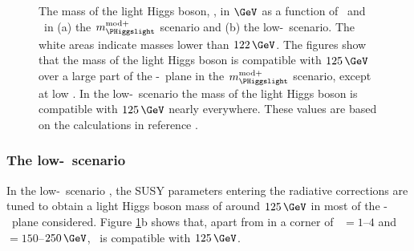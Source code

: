 \begin{figure}[h!]
\begin{center}
\end{center}
\caption[The mass of the light Higgs boson, \mh, as a function of \mA~and
\tanb~in the $m_{\PHiggslight}^{\text{mod+}}$ scenario and the low-\tanb~scenario.]{The mass of the light Higgs boson, \mh, in $\GeV$ as a function 
of \mA~and \tanb~in (a) the $m_{\PHiggslight}^{\text{mod+}}$ scenario and (b) the low-\tanb~scenario. The white areas
indicate masses lower than $122\,\GeV$. The figures show that
the mass of the light Higgs boson is compatible with $125\,\GeV$ over a large
part of the \mA-\tanb~plane in the $m_{\PHiggslight}^{\text{mod+}}$ scenario, except at low \tanb. In the low-\tanb~scenario
the mass of the light Higgs boson is compatible with $125\,\GeV$ nearly everywhere. These values are based on the calculations in reference \cite{YR3}.}
\label{fig:mhmodp_mh}
\end{figure}

\subsubsection{The low-\tanb~scenario}
\label{sec:theory_BSM_model_lowtb}
In the low-\tanb~scenario \cite{Hein-low-tb-high,MSSM-lowtanb}, the SUSY parameters entering
the radiative corrections are tuned to obtain a light 
Higgs boson mass of around $125\,\GeV$ in most of the \mbox{\mA-\tanb}~plane considered.
Figure \ref{fig:mhmodp_mh}b shows that, apart from in a corner of \tanb~$=1$--$4$ and 
\mA~$=150$--$250\,\GeV$, \mh~is compatible with $125\,\GeV$.

